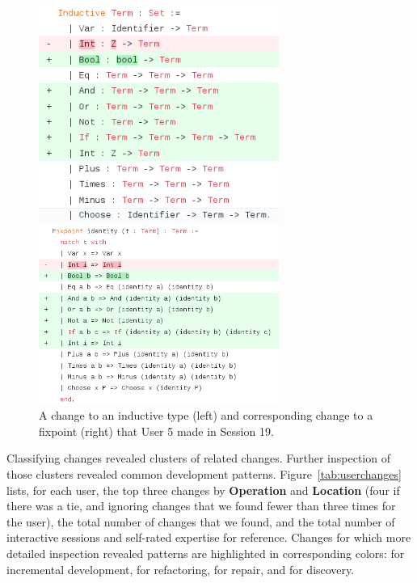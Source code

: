 \begin{figure}
\begin{minipage}{0.41\textwidth}
\centering
\includegraphics[width=0.7\textwidth]{maintenance/fig/diffs1.png}
\end{minipage}
\hfill
\begin{minipage}{0.57\textwidth}
\centering
\includegraphics[width=0.7\textwidth]{maintenance/fig/diffs2.png}
\end{minipage}
\caption{A change to an inductive type (left) and corresponding change to a fixpoint (right) that User 5 made in Session 19.}
\label{fig:ex-diff}
\end{figure}

Classifying changes revealed clusters of related changes.
Further inspection of those clusters revealed common development patterns.
Figure~\ref{tab:userchanges} lists, for each user, the top three changes
by \textbf{Operation} and \textbf{Location} 
(four if there was a tie, and ignoring changes that we found fewer than three times for the user),
the total number of changes that we found,
and the total number of  interactive sessions and self-rated expertise
for reference.
Changes for which more detailed inspection revealed patterns
are highlighted in corresponding colors:
 for incremental development,
 for refactoring,  for
repair, and  for discovery.

